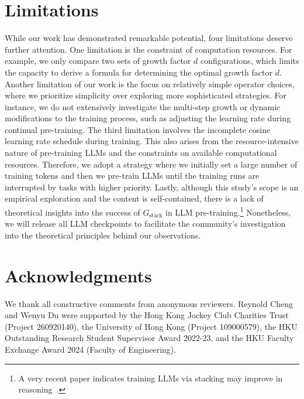 \documentclass{article}
\begin{document}
\section{Limitations}\label{sec:limitations}
While our work has demonstrated remarkable potential, four limitations deserve further attention.
One limitation is the constraint of computation resources.
For example, we only compare two sets of growth factor $d$ configurations, which limits the capacity to derive a formula for determining the optimal growth factor $d$.
Another limitation of our work is the focus on relatively simple operator choices, where we prioritize simplicity over exploring more sophisticated strategies.
For instance, we do not extensively investigate the multi-step growth or dynamic modifications to the training process, such as adjusting the learning rate during continual pre-training. 
The third limitation involves the incomplete cosine learning rate schedule during training. This also arises from the resource-intensive nature of pre-training LLMs and the constraints on available computational resources. Therefore, we adopt a strategy where we initially set a large number of training tokens and then we pre-train LLMs until the training runs are interrupted by tasks with higher priority. 
Lastly, although this study's scope is an empirical exploration and the content is self-contained, there is a lack of theoretical insights into the success of $G_{\text{stack}}$ in LLM pre-training.\footnote{A very recent paper indicates training LLMs via stacking may improve in reasoning~\cite{saunshi2024inductivebiasstackingimproving}.} 
Nonetheless, we will release all LLM checkpoints to facilitate the community's investigation into the theoretical principles behind our observations.


\section{Acknowledgments}

We thank all constructive comments from anonymous reviewers. 
Reynold Cheng and Wenyu Du were supported by the Hong Kong Jockey Club Charities Trust (Project 260920140), the University of Hong Kong (Project 109000579), the HKU Outstanding Research Student Supervisor Award 2022-23, and the HKU Faculty Exchange Award 2024 (Faculty of Engineering).



\newpage
\appendix
\end{document}

